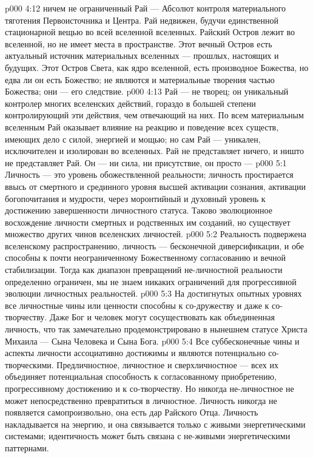 \vs p000 4:12 \pc {} ничем не ограниченный Рай --- Абсолют контроля материального тяготения Первоисточника и Центра. Рай недвижен, будучи единственной стационарной вещью во всей вселенной вселенных. Райский Остров лежит во вселенной, но не имеет места в пространстве. Этот вечный Остров есть актуальный источник материальных вселенных --- прошлых, настоящих и будущих. Этот Остров Света, как ядро вселенной, есть производное Божества, но едва ли он есть Божество; не являются и материальные творения частью Божества; они --- его следствие.
\vs p000 4:13 Рай --- не творец; он уникальный контролер многих вселенских действий, гораздо в большей степени контролирующий эти действия, чем отвечающий на них. По всем материальным вселенным Рай оказывает влияние на реакцию и поведение всех существ, имеющих дело с силой, энергией и мощью; но сам Рай --- уникален, исключителен и изолирован во вселенных. Рай не представляет ничего, и ништо не представляет Рай. Он --- ни сила, ни присутствие, он просто --- 
\vs p000 5:1 Личность --- это уровень обожествленной реальности; личность простирается ввысь от смертного и срединного уровня высшей активации сознания, активации богопочитания и мудрости, через моронтийный и духовный уровень к достижению завершенности личностного статуса. Таково эволюционное восхождение личности смертных и родственных им созданий, но существует множество других чинов вселенских личностей.
\vs p000 5:2 Реальность подвержена вселенскому распространению, личность --- бесконечной диверсификации, и обе способны к почти неограниченному Божественному согласованию и вечной стабилизации. Тогда как диапазон превращений не\hyp{}личностной реальности определенно ограничен, мы не знаем никаких ограничений для прогрессивной эволюции личностных реальностей.
\vs p000 5:3 На достигнутых опытных уровнях все личностные чины или ценности способны к со\hyp{}дружеству и даже к со\hyp{}творчеству. Даже Бог и человек могут сосуществовать как объединенная личность, что так замечательно продемонстрировано в нынешнем статусе Христа Михаила --- Сына Человека и Сына Бога.
\vs p000 5:4 Все суббесконечные чины и аспекты личности ассоциативно достижимы и являются потенциально со\hyp{}творческими. Предличностное, личностное и сверхличностное --- всех их объединяет потенциальная способность к согласованному приобретению, прогрессивному достижению и к со\hyp{}творчеству. Но никогда не\hyp{}личностное не может непосредственно превратиться в личностное. Личность никогда не появляется самопроизвольно, она есть дар Райского Отца. Личность накладывается на энергию, и она связывается только с живыми энергетическими системами; идентичность может быть связана с не\hyp{}живыми энергетическими паттернами.
